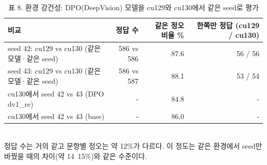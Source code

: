 \begin{table}[t]
\centering
\small
\caption{표 8. 환경 강건성: DPO(DeepVision) 모델을 cu129와 cu130에서 같은 seed로 평가}
\label{tab:table8_env_robustness}
\begin{tabular}{lrrr}
\toprule
비교 & 정답 수 & 같은 정오 비율 \% & 한쪽만 정답 (cu129 / cu130) \\
\midrule
seed 42: cu129 vs cu130 (같은 모델·같은 seed) & 586 vs 586 & 87.6 & 56 / 56 \\
seed 43: cu129 vs cu130 (같은 모델·같은 seed) & 586 vs 587 & 88.1 & 53 / 54 \\
cu130에서 seed 42 vs 43 (DPO dv1\_re) & - & 84.8 & - \\
cu130에서 seed 42 vs 43 (base) & - & 86.0 & - \\
\bottomrule
\end{tabular}
\\[2pt]{\footnotesize 정답 수는 거의 같고 문항별 정오는 약 12\%가 다르다. 이 정도는 같은 환경에서 seed만 바꿨을 때의 차이(약 14~15\%)와 같은 수준이다.}
\end{table}
